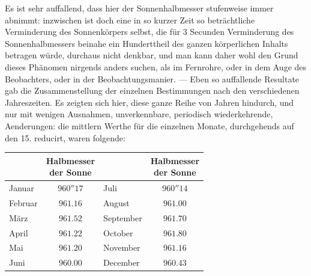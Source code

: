 Es ist sehr auffallend, dass hier der Sonnenhalbmesser stufenweise immer abnimmt: inzwischen ist doch eine in so kurzer Zeit so beträchtliche Verminderung des Sonnenkörpers selbst, die für 3 Secunden Verminderung des Sonnenhalbmessers beinahe ein Hunderttheil des ganzen körperlichen Inhalts betragen würde, durchaus nicht denkbar, und man kann daher wohl den Grund dieses Phänomen nirgends anders suchen, als im Fernrohre, oder in dem Auge des Beobachters, oder in der Beobachtungsmanier. — Eben so auffallende Resultate gab die Zusammenstellung der einzelnen Bestimmungen nach den verschiedenen Jahreszeiten. Es zeigten sich hier, diese ganze Reihe von Jahren hindurch, und nur mit wenigen Ausnahmen, unverkennbare, periodisch wiederkehrende, Aenderungen: die mittlern Werthe für die einzelnen Monate, durchgehends auf den 15. reducirt, waren folgende:

\begin{center}\begin{tabular}{l|c||l|c}
&\shortstack{Halbmesser\\der Sonne}&&\shortstack{Halbmesser\\der Sonne}\\ \hline
Januar & $960''17$ & Juli & $960''14$ \\
Februar & $961.16$ & August & $961.00$ \\
März & $961.52$ & September & $961.70$ \\
April & $961.22$ & October & $961.80$ \\
Mai & $961.20$ & November & $961.16$ \\
Juni & $960.00$ & December & $960.43$ \\
\end{tabular}\end{center}

